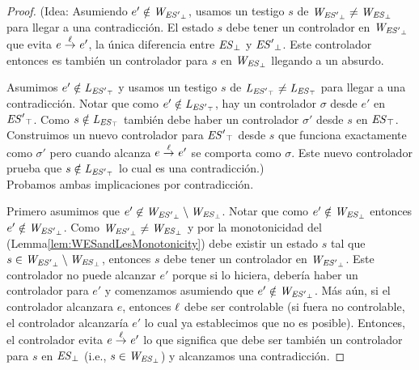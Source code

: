 \begin{proof}
	(Idea: Asumiendo $e' \notin \mathit{W_{\mathit{{\mathit{ES}'}_{\bot}}}}$, usamos un testigo $s$ de $\mathit{W_{\mathit{{\mathit{ES}'}_{\bot}}}} \neq 
	\mathit{W_{\mathit{{\mathit{ES}}_{\bot}}}}$ para llegar a una contradicción. El estado $s$ debe tener un controlador en 
	$\mathit{W_{\mathit{{\mathit{ES}'}_{\bot}}}}$ que evita $e \overset{\ell}{\rightarrow}_{} e'$, la única diferencia entre $\mathit{{\mathit{ES}}_{\bot}}$ y $\mathit{{\mathit{ES}'}_{\bot}}$. Este controlador entonces es también un controlador para $s$ en $\mathit{W_{\mathit{{\mathit{ES}}_{\bot}}}}$ llegando a un absurdo. 
	
	Asumimos $e' \notin \mathit{L_{\mathit{{\mathit{ES}'}_{\top}}}}$ y usamos un testigo $s$ de $\mathit{L_{\mathit{{\mathit{ES}'}_{\top}}}} \neq \mathit{L_{\mathit{{\mathit{ES}}_{\top}}}}$ para llegar a una contradicción. Notar que como $e' \notin \mathit{L_{\mathit{{\mathit{ES}'}_{\top}}}}$, hay un controlador $\sigma$ desde $e'$ en  
	$\mathit{{\mathit{ES}'}_{\top}}$. Como $s \notin \mathit{L_{\mathit{{\mathit{ES}}_{\top}}}}$ también debe haber un controlador $\sigma'$ desde $s$ en $\mathit{{\mathit{ES}}_{\top}}$. Construimos un nuevo controlador para $\mathit{{\mathit{ES}'}_{\top}}$ desde $s$ que funciona exactamente como $\sigma'$ pero cuando alcanza $e \overset{\ell}{\rightarrow}_{} e'$ se comporta como $\sigma$. Este nuevo controlador prueba que $s \notin \mathit{L_{\mathit{{\mathit{ES}'}_{\top}}}}$ lo cual es una contradicción.)\\


Probamos ambas implicaciones por contradicción. 

Primero asumimos que $e' \not \in 
\mathit{W_{\mathit{{\mathit{ES}'}_{\bot}}}} \setminus \mathit{W_{\mathit{{\mathit{ES}}_{\bot}}}}$. Notar que como $e' \notin \mathit{W_{\mathit{{\mathit{ES}}_{\bot}}}}$ entonces $e' \notin \mathit{W_{\mathit{{\mathit{ES}'}_{\bot}}}}$. Como $\mathit{W_{\mathit{{\mathit{ES}'}_{\bot}}}} \neq \mathit{W_{\mathit{{\mathit{ES}}_{\bot}}}}$ y por la monotonicidad del (Lemma\ref{lem:WESandLesMonotonicity}) debe existir un estado $s$ tal que $s \in \mathit{W_{\mathit{{\mathit{ES}'}_{\bot}}}} \setminus 
\mathit{W_{\mathit{{\mathit{ES}}_{\bot}}}}$, entonces $s$ debe tener un controlador en $\mathit{W_{\mathit{{\mathit{ES}'}_{\bot}}}} $. Este controlador no puede alcanzar $e'$ porque si lo hiciera, debería haber un controlador para $e'$ y comenzamos asumiendo que $e' 
\notin \mathit{W_{\mathit{{\mathit{ES}'}_{\bot}}}}$. Más aún, si el controlador alcanzara $e$, entonces $\ell$ debe ser controlable (si fuera no controlable, el controlador alcanzaría $e'$ lo cual ya establecimos que no es posible). Entonces, el controlador evita $e \overset{\ell}{\rightarrow}_{} e'$ lo que significa que debe ser también un controlador para $s$ en $\mathit{{\mathit{ES}}_{\bot}}$ (i.e.,  $s \in \mathit{W_{\mathit{{\mathit{ES}}_{\bot}}}}$) y alcanzamos una contradicción.


\end{proof}
